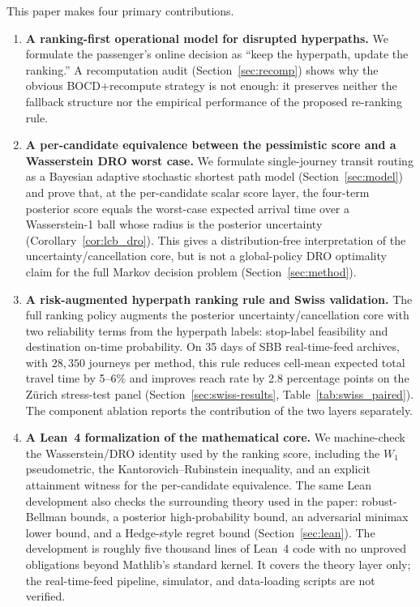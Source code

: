 \documentclass[opre,dblanonrev]{informs4}
\begin{document}
This paper makes four primary contributions.
\begin{enumerate}
\item \textbf{A ranking-first operational model for disrupted
hyperpaths.} We formulate the passenger's online decision as
``keep the hyperpath, update the ranking.'' A recomputation audit
(Section~\ref{sec:recomp}) shows why the obvious BOCD$+$recompute
strategy is not enough: it preserves neither the fallback structure
nor the empirical performance of the proposed re-ranking rule.
\item \textbf{A per-candidate equivalence between the pessimistic
score and a Wasserstein DRO worst case.} We formulate single-journey
transit routing as a Bayesian adaptive stochastic shortest path
model (Section~\ref{sec:model}) and prove that, at the
per-candidate scalar score layer, the four-term posterior score
equals the worst-case expected arrival time over a Wasserstein-1
ball whose radius is the posterior uncertainty
(Corollary~\ref{cor:lcb_dro}). This gives a distribution-free
interpretation of the uncertainty/cancellation core, but is not a
global-policy DRO optimality claim for the full Markov decision
problem (Section~\ref{sec:method}).
\item \textbf{A risk-augmented hyperpath ranking rule and Swiss
validation.} The full ranking policy augments the posterior
uncertainty/cancellation core with two reliability terms from the
hyperpath labels: stop-label feasibility and destination on-time
probability. On 35 days of SBB real-time-feed archives, with
$28{,}350$ journeys per method, this rule reduces cell-mean expected
total travel time by 5--6\% and improves reach rate by 2.8
percentage points on the Z\"urich stress-test panel
(Section~\ref{sec:swiss-results}, Table~\ref{tab:swiss_paired}). The
component ablation reports the contribution of the two layers
separately.
\item \textbf{A Lean~4 formalization of the mathematical core.}
We machine-check the Wasserstein/DRO identity used by the ranking
score, including the $W_1$ pseudometric, the
Kantorovich--Rubinstein inequality, and an explicit attainment
witness for the per-candidate equivalence. The same Lean development
also checks the surrounding theory used in the paper: robust-Bellman
bounds, a posterior high-probability bound, an adversarial minimax
lower bound, and a Hedge-style regret bound
(Section~\ref{sec:lean}). The development is roughly five thousand
lines of Lean~4 code with no unproved obligations beyond Mathlib's
standard kernel. It covers the theory layer only; the real-time-feed
pipeline, simulator, and data-loading scripts are not verified.
\end{enumerate}
\end{document}

